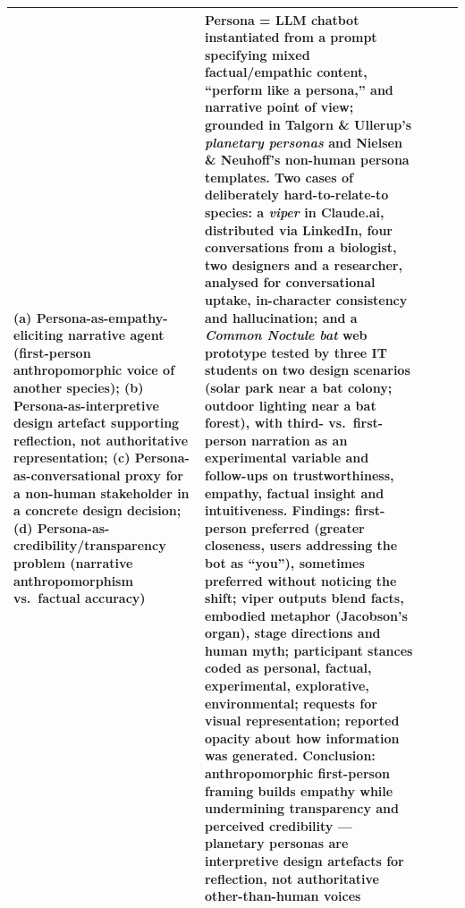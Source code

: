 \begin{table}[t]
\begin{tabular}{p{0.5cm} p{3.6cm} p{3.4cm} p{3.6cm} p{3.6cm}}
(a) Persona-as-empathy-eliciting narrative agent (first-person anthropomorphic voice of another species); (b) Persona-as-interpretive design artefact supporting reflection, not authoritative representation; (c) Persona-as-conversational proxy for a non-human stakeholder in a concrete design decision; (d) Persona-as-credibility/transparency problem (narrative anthropomorphism vs.\ factual accuracy) &
Persona = LLM chatbot instantiated from a prompt specifying mixed factual/empathic content, ``perform like a persona,'' and narrative point of view; grounded in Talgorn \& Ullerup's \emph{planetary personas} and Nielsen \& Neuhoff's non-human persona templates. Two cases of deliberately hard-to-relate-to species: a \emph{viper} in Claude.ai, distributed via LinkedIn, four conversations from a biologist, two designers and a researcher, analysed for conversational uptake, in-character consistency and hallucination; and a \emph{Common Noctule bat} web prototype tested by three IT students on two design scenarios (solar park near a bat colony; outdoor lighting near a bat forest), with third- vs.\ first-person narration as an experimental variable and follow-ups on trustworthiness, empathy, factual insight and intuitiveness. Findings: first-person preferred (greater closeness, users addressing the bot as ``you''), sometimes preferred without noticing the shift; viper outputs blend facts, embodied metaphor (Jacobson's organ), stage directions and human myth; participant stances coded as personal, factual, experimental, explorative, environmental; requests for visual representation; reported opacity about how information was generated. Conclusion: anthropomorphic first-person framing builds empathy while undermining transparency and perceived credibility --- planetary personas are interpretive design artefacts for reflection, not authoritative other-than-human voices \\
\bottomrule
\end{tabular}
\end{table}
